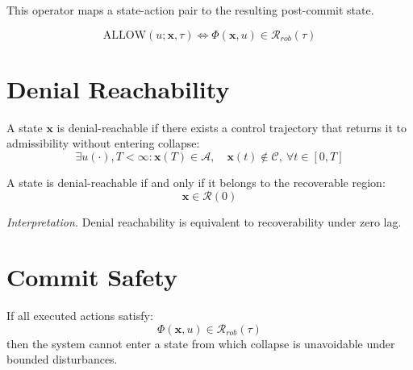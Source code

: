 \documentclass[letterpaper, 10 pt, conference]{ieeeconf}
\begin{document}
This operator maps a state-action pair to the resulting post-commit state.

\begin{definition}
\begin{equation}
\text{ALLOW}(u; \mathbf{x}, \tau)
\iff
\Phi(\mathbf{x}, u) \in \mathcal{R}_{rob}(\tau)
\end{equation}
\end{definition}

\section{Denial Reachability}

\begin{definition}
A state $\mathbf{x}$ is denial-reachable if there exists a control trajectory that returns it to admissibility without entering collapse:
\begin{equation}
\exists u(\cdot), T < \infty:
\mathbf{x}(T) \in \mathcal{A}, \quad
\mathbf{x}(t) \notin \mathcal{C}, \ \forall t \in [0,T]
\end{equation}
\end{definition}

\begin{proposition}
A state is denial-reachable if and only if it belongs to the recoverable region:
\begin{equation}
\mathbf{x} \in \mathcal{R}(0)
\end{equation}
\end{proposition}

\textit{Interpretation.}
Denial reachability is equivalent to recoverability under zero lag.

\section{Commit Safety}

\begin{theorem}
If all executed actions satisfy:
\begin{equation}
\Phi(\mathbf{x}, u) \in \mathcal{R}_{rob}(\tau)
\end{equation}
then the system cannot enter a state from which collapse is unavoidable under bounded disturbances.
\end{theorem}
\end{document}
